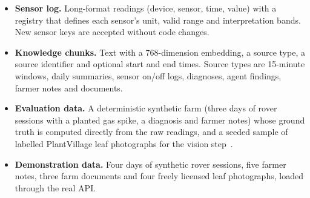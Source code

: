 \begin{itemize}
\item \textbf{Sensor log.} Long-format readings (device, sensor, time, value) with a registry that defines each sensor's unit, valid range and
      interpretation bands. New sensor keys are accepted without code changes.
\item \textbf{Knowledge chunks.} Text with a 768-dimension embedding, a source type, a source identifier and optional start and end times.
      Source types are 15-minute windows, daily summaries, sensor on/off logs, diagnoses, agent findings, farmer notes and documents.
\item \textbf{Evaluation data.} A deterministic synthetic farm (three days of rover sessions with a planted gas spike, a
      diagnosis and farmer notes) whose ground truth is computed directly from the raw readings, and a seeded sample of labelled
      PlantVillage leaf photographs for the vision step~\cite{mohanty2016plantvillage,hughes2015plantvillage}.
\item \textbf{Demonstration data.} Four days of synthetic rover sessions, five farmer notes, three farm documents and four
      freely licensed leaf photographs, loaded through the real API.
\end{itemize}
